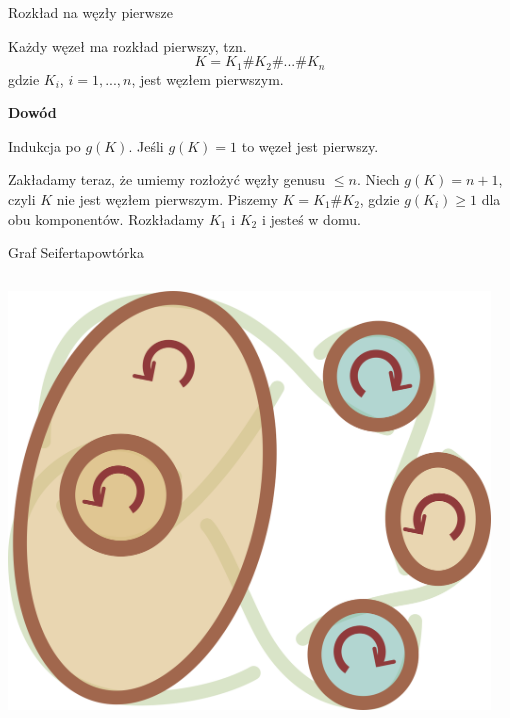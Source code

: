 \documentclass{beamer}
\begin{document}
\begin{frame}{Rozkład na węzły pierwsze}
  \begin{theorem}
    Każdy węzeł ma rozkład pierwszy, tzn.
    $$K=K_1\# K_2\# ...\# K_n$$
    gdzie $K_i$, $i=1,..., n$, jest węzłem pierwszym.
  \end{theorem}

  \textbf{\color{orange}Dowód}

  Indukcja po $g(K)$. Jeśli $g(K)=1$ to węzeł jest pierwszy.

  Zakładamy teraz, że umiemy rozłożyć węzły genusu $\leq n$. Niech $g(K)=n+1$, czyli $K$ nie jest węzłem pierwszym. Piszemy $K=K_1\# K_2$, gdzie $g(K_i)\geq 1$ dla obu komponentów. Rozkładamy $K_1$ i $K_2$ i jesteś w domu.
\end{frame}

\begin{frame}{Graf Seiferta}{powtórka}
  \begin{columns}
    \begin{column}{0.5\textwidth}\centering
      \includegraphics[width=\textwidth]{6_1-seifert.png}
    \end{column}
    \begin{column}{0.5\textwidth}\centering
    \end{column}
  \end{columns}
  \bigskip 
  \centering
\end{frame}
\end{document}
